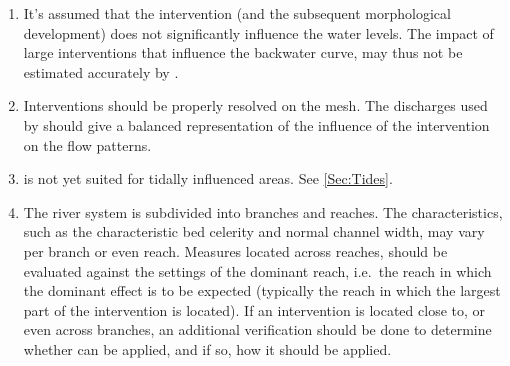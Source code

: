 \begin{enumerate}
\item It's assumed that the intervention (and the subsequent morphological development) does not significantly influence the water levels.
The impact of large interventions that influence the backwater curve, may thus not be estimated accurately by \dfmi.

\item Interventions should be properly resolved on the \dflowfm mesh.
The discharges used by \dfmi should give a balanced representation of the influence of the intervention on the flow patterns.

\item \dfastmi is not yet suited for tidally influenced areas.
See \autoref{Sec:Tides}.

\item \label{reach_bnd} The river system is subdivided into branches and reaches.
The characteristics, such as the characteristic bed celerity and normal channel width, may vary per branch or even reach.
Measures located across reaches, should be evaluated against the settings of the dominant reach, i.e.~the reach in which the dominant effect is to be expected (typically the reach in which the largest part of the intervention is located).
If an intervention is located close to, or even across branches, an additional verification should be done to determine whether \dfmi can be applied, and if so, how it should be applied.


\end{enumerate}
